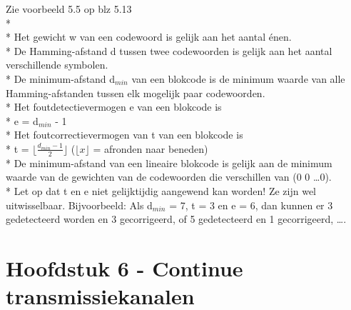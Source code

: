 \documentclass[10pt]{article}
\begin{document}
{\scriptsize Zie voorbeeld 5.5 op blz 5.13}\\*\\*
Het gewicht w van een codewoord is gelijk aan het aantal \'enen.\\*
De Hamming-afstand d tussen twee codewoorden is gelijk aan het aantal verschillende symbolen.\\*
De minimum-afstand d$_{min}$ van een blokcode is de minimum waarde van alle Hamming-afstanden tussen elk mogelijk paar codewoorden.\\*
Het foutdetectievermogen e van een blokcode is\\*
e = d$_{min}$ - 1\\*
Het foutcorrectievermogen van t van een blokcode is\\*
t = $\lfloor{\frac{d_{min}-1}{2}}\rfloor$ {\scriptsize ($\lfloor x\rfloor$ = afronden naar beneden)}\\*
De minimum-afstand van een lineaire blokcode is gelijk aan de minimum waarde van de gewichten van de codewoorden die verschillen van (0 0 \dots 0).\\*
{\scriptsize Let op dat t en e niet gelijktijdig aangewend kan worden! Ze zijn wel uitwisselbaar. Bijvoorbeeld: Als d$_{min}$ = 7, t = 3 en e = 6, dan kunnen er 3 gedetecteerd worden en 3 gecorrigeerd, of 5 gedetecteerd en 1 gecorrigeerd, \dots.}
\section{Hoofdstuk 6 - Continue transmissiekanalen}
\end{document}
